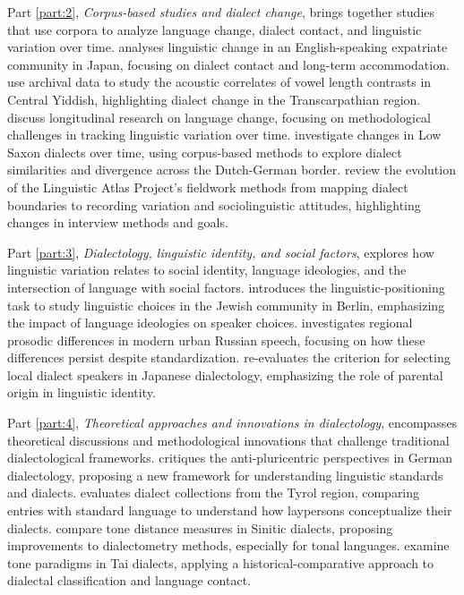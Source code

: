 \begin{refsection}
Part \ref{part:2}, \emph{Corpus-based studies and dialect change}, brings together studies that use corpora to analyze language change, dialect contact, and linguistic variation over time.
\citeauthor{chapters/05-hirano} analyses linguistic change in an English-speaking expatriate community in Japan, focusing on dialect contact and long-term accommodation. \citeauthor{chapters/06-nove} use archival data to study the acoustic correlates of vowel length contrasts in Central Yiddish, highlighting dialect change in the Transcarpathian region. \citeauthor{chapters/07-pabst} discuss longitudinal research on language change, focusing on methodological challenges in tracking linguistic variation over time. \citeauthor{chapters/08-siewert} investigate changes in Low Saxon dialects over time, using corpus-based methods to explore dialect similarities and divergence across the Dutch-German border. \citeauthor{chapters/09-burkette} review the evolution of the Linguistic Atlas Project’s fieldwork methods from mapping dialect boundaries to recording variation and sociolinguistic attitudes, highlighting changes in interview methods and goals.

Part \ref{part:3}, \emph{Dialectology, linguistic identity, and social factors}, explores how linguistic variation relates to social identity, language ideologies, and the intersection of language with social factors.
\citeauthor{chapters/10-jahns} introduces the linguistic-positioning task to study linguistic choices in the Jewish community in Berlin, emphasizing the impact of language ideologies on speaker choices. \citeauthor{chapters/11-post} investigates regional prosodic differences in modern urban Russian speech, focusing on how these differences persist despite standardization. \citeauthor{chapters/12-takemura} re-evaluates the criterion for selecting local dialect speakers in Japanese dialectology, emphasizing the role of parental origin in linguistic identity.

Part \ref{part:4}, \emph{Theoretical approaches and innovations in dialectology}, encompasses theoretical discussions and methodological innovations that challenge traditional dialectological frameworks.
\citeauthor{chapters/13-dollinger} critiques the anti-pluricentric perspectives in German dialectology, proposing a new framework for understanding linguistic standards and dialects. \citeauthor{chapters/14-kathrein} evaluates dialect collections from the Tyrol region, comparing entries with standard language to understand how laypersons conceptualize their dialects. \citeauthor{chapters/15-sung} compare tone distance measures in Sinitic dialects, proposing improvements to dialectometry methods, especially for tonal languages. \citeauthor{chapters/16-yurayong} examine tone paradigms in Tai dialects, applying a historical-comparative approach to dialectal classification and language contact.


\end{refsection}
